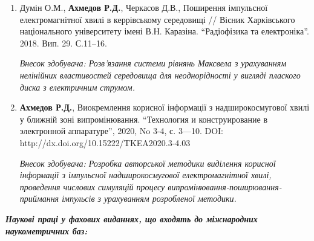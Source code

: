 {\begin{enumerate}
		\item Думін О.М., \textbf{Ахмедов Р.Д.}, Черкасов Д.В., Поширення імпульсної 
		електромагнітної хвилі в керрівському середовищі // Вісник Харківського 
		національного університету імені В.Н. Каразіна. ``Радіофізика та 
		електроніка''. 2018. Вип. 29. С.11--16.
		
		\textit{Внесок здобувача: Розв'язання системи рівнянь Максвела з урахуванням
			нелінійних властивостей середовища для неоднорідності у вигляді плаского 
			диска з електричним струмом.}
		
		\item \textbf{Ахмедов Р.Д.}, Виокремлення корисної інформації з 
		надширокосмугової хвилі у ближній зоні випромінювання. ``Технология и 
		конструирование в электронной аппаратуре'', 2020, No 3-4, с. 3—10. DOI: 
		http://dx.doi.org/10.15222/TKEA2020.3-4.03
		
		\textit{Внесок здобувача: Розробка авторської методики виділення корисної 
			інформації з імпульсної надширокосмугової електромагнітної хвилі, проведення 
			числових симуляцій процесу випромінювання-поширювання-приймання імпульсів з
			урахуванням розробленої методики.}
		
		\setcounter{ItemsInMyWriting}{\value{enumi}}
	\end{enumerate}

%		
%		
%		
%		
		
	\begin{center} 
		\textit{\textbf{Наукові праці у фахових виданнях, що входять до 
				міжнародних наукометричних баз:}}
	\end{center}
	
	\begin{enumerate}
		\setcounter{enumi}{\value{ItemsInMyWriting}}
		

\end{enumerate}}
